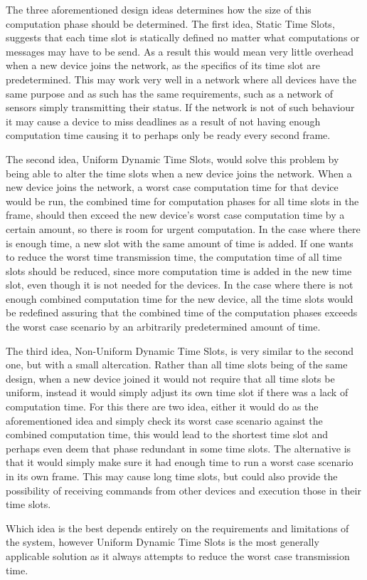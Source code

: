 \bigskip
\noindent The three aforementioned design ideas determines how the size of this computation phase should be determined.
The first idea, Static Time Slots, suggests that each time slot is statically defined no matter what computations or messages may have to be send.
As a result this would mean very little overhead when a new device joins the network, as the specifics of its time slot are predetermined.
This may work very well in a network where all devices have the same purpose and as such has the same requirements, such as a network of sensors simply transmitting their status.
If the network is not of such behaviour it may cause a device to miss deadlines as a result of not having enough computation time causing it to perhaps only be ready every second frame.

The second idea, Uniform Dynamic Time Slots, would solve this problem by being able to alter the time slots when a new device joins the network.
When a new device joins the network, a worst case computation time for that device would be run, the combined time for computation phases for all time slots in the frame, should then exceed the new device's worst case computation time by a certain amount, so there is room for urgent computation. 
In the case where there is enough time, a new slot with the same amount of time is added.
If one wants to reduce the worst time transmission time, the computation time of all time slots should be reduced, since more computation time is added in the new time slot, even though it is not needed for the devices.
In the case where there is not enough combined computation time for the new device, all the time slots would be redefined assuring that the combined time of the computation phases exceeds the worst case scenario by an arbitrarily predetermined amount of time.

The third idea, Non-Uniform Dynamic Time Slots, is very similar to the second one, but with a small altercation.
Rather than all time slots being of the same design, when a new device joined it would not require that all time slots be uniform, instead it would simply adjust its own time slot if there was a lack of computation time.
For this there are two idea, either it would do as the aforementioned idea and simply check its worst case scenario against the combined computation time, this would lead to the shortest time slot and perhaps even deem that phase redundant in some time slots.
The alternative is that it would simply make sure it had enough time to run a worst case scenario in its own frame.
This may cause long time slots, but could also provide the possibility of receiving commands from other devices and execution those in their time slots.

\bigskip
\noindent Which idea is the best depends entirely on the requirements and limitations of the system, however Uniform Dynamic Time Slots is the most generally applicable solution as it always attempts to reduce the worst case transmission time.